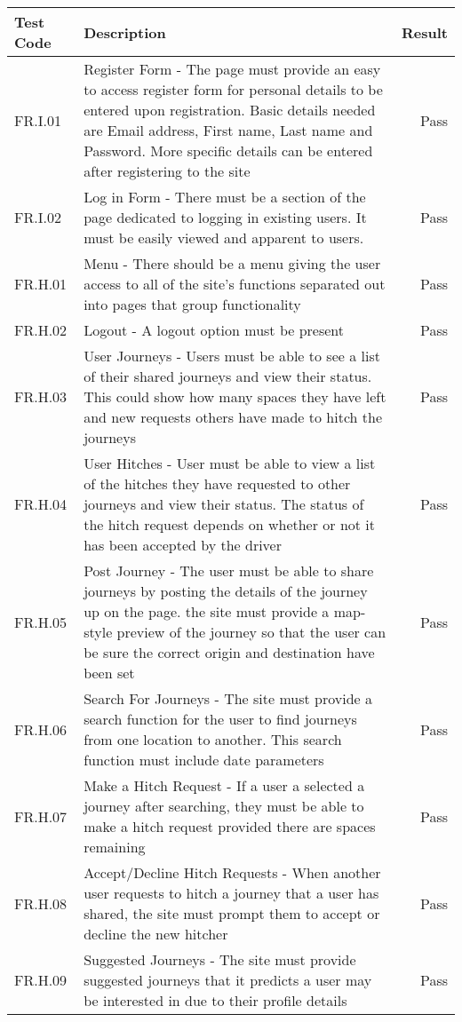 \begin{longtable}{| l | p{9cm} | r |}
\hline
Test Code & Description & Result \\
\hline
FR.I.01 & Register Form - The page must provide an easy to access register form for personal details to be entered upon registration. Basic details needed are Email address, First name, Last name and Password. More specific details can be entered after registering to the site & Pass \\
\hline
FR.I.02 & Log in Form - There must be a section of the page dedicated to logging in existing users. It must be easily viewed and apparent to users. & Pass \\
\hline
FR.H.01 & Menu - There should be a menu giving the user access to all of the site's functions separated out into pages that group functionality & Pass \\
\hline
FR.H.02 & Logout - A logout option must be present & Pass \\
\hline
FR.H.03 & User Journeys - Users must be able to see a list of their shared journeys and view their status. This could show how many spaces they have left and new requests others have made to hitch the journeys & Pass \\
\hline
FR.H.04 & User Hitches - User must be able to view a list of the hitches they have requested to other journeys and view their status. The status of the hitch request depends on whether or not it has been accepted by the driver & Pass \\
\hline
FR.H.05 & Post Journey - The user must be able to share journeys by posting the details of the journey up on the page. the site must provide a map-style preview of the journey so that the user can be sure the correct origin and destination have been set & Pass \\
\hline
FR.H.06 &Search For Journeys - The site must provide a search function for the user to find journeys from one location to another. This search function must include date parameters & Pass \\
\hline
FR.H.07 & Make a Hitch Request - If a user a selected a journey after searching, they must be able to make a hitch request provided there are spaces remaining & Pass \\
\hline
FR.H.08 &  Accept/Decline Hitch Requests - When another user requests to hitch a journey that a user has shared, the site must prompt them to accept or decline the new hitcher & Pass \\
\hline
FR.H.09 & Suggested Journeys - The site must provide suggested journeys that it predicts a user may be interested in due to their profile details & Pass \\

\end{longtable}
